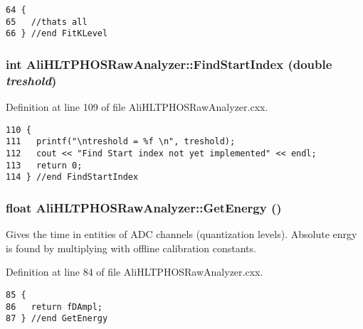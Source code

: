 \footnotesize\begin{verbatim}64 {
65   //thats all 
66 } //end FitKLevel
\end{verbatim}\normalsize 


\subsubsection{\setlength{\rightskip}{0pt plus 5cm}int Ali\-HLTPHOSRaw\-Analyzer::Find\-Start\-Index (double {\em treshold})\hspace{0.3cm}{\tt  [inherited]}}\label{classAliHLTPHOSRawAnalyzer_AliHLTPHOSRawAnalyzerPeakFindera9}




Definition at line 109 of file Ali\-HLTPHOSRaw\-Analyzer.cxx.

\footnotesize\begin{verbatim}110 {
111   printf("\ntreshold = %f \n", treshold);
112   cout << "Find Start index not yet implemented" << endl;
113   return 0;
114 } //end FindStartIndex
\end{verbatim}\normalsize 


\subsubsection{\setlength{\rightskip}{0pt plus 5cm}float Ali\-HLTPHOSRaw\-Analyzer::Get\-Energy ()\hspace{0.3cm}{\tt  [inherited]}}\label{classAliHLTPHOSRawAnalyzer_AliHLTPHOSRawAnalyzerPeakFindera11}


Gives the time in entities of ADC channels (quantization levels). Absolute enrgy is found by multiplying with offline calibration constants. 

Definition at line 84 of file Ali\-HLTPHOSRaw\-Analyzer.cxx.

\footnotesize\begin{verbatim}85 {
86   return fDAmpl;
87 } //end GetEnergy
\end{verbatim}\normalsize 


